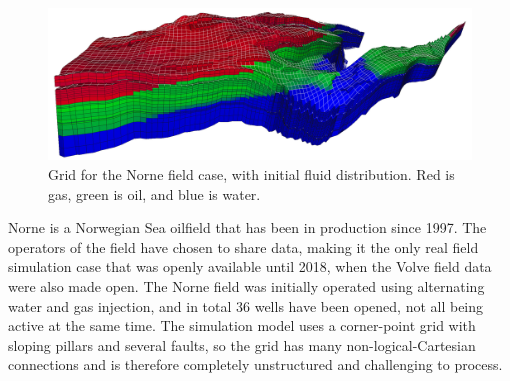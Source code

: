 \begin{figure}
  \centering
  \includegraphics[width=1.0\textwidth]{figures/norne/norne_grid2}
  \caption{Grid for the Norne field case, with initial fluid
    distribution. Red is gas, green is oil, and blue is water.}
  \label{fig:norne_grid}
\end{figure}

Norne is a Norwegian Sea oilfield that has been in
production since 1997. The operators of the field have chosen to share
data, making it the only real field simulation case that was
openly available until 2018, when the Volve field data were also made open.
The Norne field was initially operated using alternating
water and gas injection, and in total 36 wells have been opened, not
all being active at the same time. The simulation model uses a
corner-point grid with sloping pillars and several faults, so the grid
has many non-logical-Cartesian connections and is therefore completely
unstructured and challenging to process.

